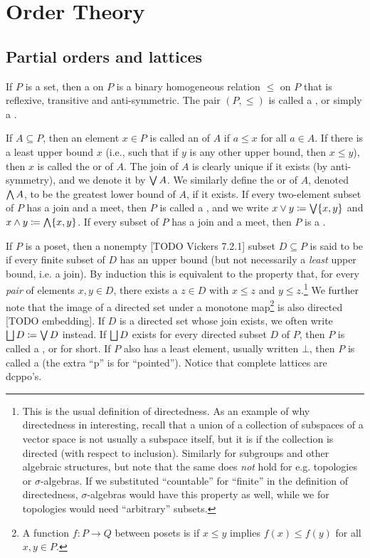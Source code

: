 \documentclass[a4paper, 11pt, article, danish, oneside]{memoir}
\newcommand{\meet}{\land}
\newcommand{\join}{\lor}
\DeclareMathOperator*{\smallbigvee}{\textstyle\bigvee}
\DeclareMathOperator*{\bigjoin}{\mathchoice
    {\smallbigvee}%
    {\bigvee}%
    {\bigvee}%
    {\bigvee}%
}
\DeclareMathOperator*{\smallbigsqcup}{\textstyle\bigsqcup}
\DeclareMathOperator*{\bigdjoin}{\mathchoice
    {\smallbigsqcup}%
    {\bigsqcup}%
    {\bigsqcup}%
    {\bigsqcup}%
}
\DeclareMathOperator*{\smallbigwedge}{\textstyle\bigwedge}
\DeclareMathOperator*{\bigmeet}{\mathchoice
    {\smallbigwedge}%
    {\bigwedge}%
    {\bigwedge}%
    {\bigwedge}%
}
\newcommand{\defeq}{\coloneqq}
\begin{document}
\appendix

\chapter{Order Theory}

\section{Partial orders and lattices}

If $P$ is a set, then a  on $P$ is a binary homogeneous relation $\leq$ on $P$ that is reflexive, transitive and anti-symmetric. The pair $(P,\leq)$ is called a , or simply a .

If $A \subseteq P$, then an element $x \in P$ is called an  of $A$ if $a \leq x$ for all $a \in A$. If there is a least upper bound $x$ (i.e., such that if $y$ is any other upper bound, then $x \leq y$), then $x$ is called the  or  of $A$. The join of $A$ is clearly unique if it exists (by anti-symmetry), and we denote it by $\bigjoin A$. We similarly define the  or  of $A$, denoted $\bigmeet A$, to be the greatest lower bound of $A$, if it exists. If every two-element subset of $P$ has a join and a meet, then $P$ is called a , and we write $x \join y \defeq \bigjoin \{x,y\}$ and $x \meet y \defeq \bigmeet \{x,y\}$. If every subset of $P$ has a join and a meet, then $P$ is a .

If $P$ is a poset, then a nonempty [TODO Vickers 7.2.1] subset $D \subseteq P$ is said to be  if every finite subset of $D$ has an upper bound (but not necessarily a \emph{least} upper bound, i.e. a join). By induction this is equivalent to the property that, for every \emph{pair} of elements $x,y \in D$, there exists a $z \in D$ with $x \leq z$ and $y \leq z$.\footnote{This is the usual definition of directedness. As an example of why directedness in interesting, recall that a union of a collection of subspaces of a vector space is not usually a subspace itself, but it is if the collection is directed (with respect to inclusion). Similarly for subgroups and other algebraic structures, but note that the same does \emph{not} hold for e.g. topologies or $\sigma$-algebras. If we substituted \enquote{countable} for \enquote{finite} in the definition of directedness, $\sigma$-algebras would have this property as well, while we for topologies would need \enquote{arbitrary} subsets.} We further note that the image of a directed set under a monotone map\footnote{A function $f \colon P \to Q$ between posets is  if $x \leq y$ implies $f(x) \leq f(y)$ for all $x,y \in P$.} is also directed [TODO embedding]. If $D$ is a directed set whose join exists, we often write $\bigdjoin D \defeq \bigjoin D$ instead. If $\bigdjoin D$ exists for every directed subset $D$ of $P$, then $P$ is called a , or  for short. If $P$ also has a least element, usually written $\bot$, then $P$ is called a  (the extra \enquote{p} is for \enquote{pointed}). Notice that complete lattices are dcppo's.
\end{document}
